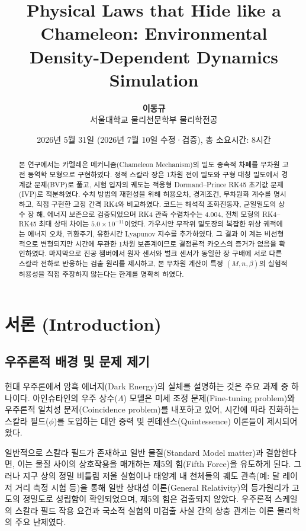 \documentclass[11pt, a4paper]{article}
\title{
    \bfseries\Large 
    Physical Laws that Hide like a Chameleon: Environmental Density-Dependent Dynamics Simulation
}
\author{
    \textbf{이동규} \\
    \small 서울대학교 물리천문학부 물리학전공 \\
}
\date{2026년 5월 31일 (2026년 7월 10일 수정·검증), 총 소요시간: 8시간}
\begin{document}
\maketitle

\begin{abstract}
본 연구에서는 카멜레온 메커니즘(Chameleon Mechanism)의 밀도 종속적 차폐를 무차원 고전 동역학 모형으로 구현하였다. 정적 스칼라 장은 1차원 전이 밀도와 구형 대칭 밀도에서 경계값 문제(BVP)로 풀고, 시험 입자의 궤도는 적응형 Dormand--Prince RK45 초기값 문제(IVP)로 적분하였다. 수치 방법의 재현성을 위해 허용오차, 경계조건, 무차원화 계수를 명시하고, 직접 구현한 고정 간격 RK4와 비교하였다. 코드는 해석적 조화진동자, 균일밀도의 상수 장 해, 에너지 보존으로 검증되었으며 RK4 관측 수렴차수는 4.004, 전체 모형의 RK4--RK45 최대 상태 차이는 $5.0\times10^{-11}$이었다. 가우시안 무작위 밀도장의 복잡한 위상 궤적에는 에너지 오차, 귀환주기, 유한시간 Lyapunov 지수를 추가하였다. 그 결과 이 계는 비선형적으로 변형되지만 시간에 무관한 1차원 보존계이므로 결정론적 카오스의 증거가 없음을 확인하였다. 마지막으로 진공 챔버에서 원자 센서와 벌크 센서가 동일한 장 구배에 서로 다른 스칼라 전하로 반응하는 검출 원리를 제시하고, 본 무차원 계산이 특정 $(M,n,\beta)$의 실험적 허용성을 직접 주장하지 않는다는 한계를 명확히 하였다.
\end{abstract}

\section{서론 (Introduction)}

\subsection{우주론적 배경 및 문제 제기}
현대 우주론에서 암흑 에너지(Dark Energy)의 실체를 설명하는 것은 주요 과제 중 하나이다. 아인슈타인의 우주 상수($\Lambda$) 모델은 미세 조정 문제(Fine-tuning problem)와 우주론적 일치성 문제(Coincidence problem)를 내포하고 있어, 시간에 따라 진화하는 스칼라 필드($\phi$)를 도입하는 대안 중력 및 퀸테센스(Quintessence) 이론들이 제시되어 왔다.

일반적으로 스칼라 필드가 존재하고 일반 물질(Standard Model matter)과 결합한다면, 이는 물질 사이의 상호작용을 매개하는 제5의 힘(Fifth Force)을 유도하게 된다. 그러나 지구 상의 정밀 비틀림 저울 실험이나 태양계 내 천체들의 궤도 관측(예: 달 레이저 거리 측정 시험 등)을 통해 일반 상대성 이론(General Relativity)의 등가원리가 고도의 정밀도로 성립함이 확인되었으며, 제5의 힘은 검출되지 않았다. 우주론적 스케일의 스칼라 필드 작용 요건과 국소적 실험의 미검출 사실 간의 상충 관계는 이론 물리학의 주요 난제였다.
\end{document}
